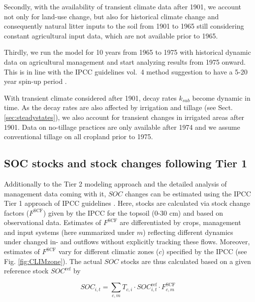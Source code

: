 \documentclass[gc, manuscript]{copernicus}
\begin{document}
Secondly, with the availability of transient climate data after 1901, we account not only for land-use change, but also for historical climate change and consequently natural litter inputs to the soil from 1901 to 1965 still considering constant agricultural input data, which are not available prior to 1965.

Thirdly, we run the model for 10 years from 1965 to 1975 with historical dynamic data on agricultural management and start analyzing results from 1975 onward. This is in line with the IPCC guidelines vol.~4 method suggestion to have a 5-20 year spin-up period \citep{ogle_cropland_in_ipcc_2019}.

With transient climate considered after 1901, decay rates \(k_{sub}\) become dynamic in time. As the decay rates are also affected by irrigation and tillage (see Sect. \ref{sec:steadystates}), we also account for transient changes in irrigated areas after 1901. Data on no-tillage practices are only available after 1974 and we assume conventional tillage on all cropland prior to 1975.

\hypertarget{sec:tier1}{%
\subsection{SOC stocks and stock changes following Tier 1}\label{sec:tier1}}

Additionally to the Tier 2 modeling approach \citep{ogle_cropland_in_ipcc_2019} and the detailed analysis of management data coming with it, \(SOC\) changes can be estimated using the IPCC Tier 1 approach of IPCC guidelines \citep{eggleston_ipcc_2006, calvo_buendia_ipcc_2019}. Here, stocks are calculated via stock change factors (\(F^{\mathrm{SCF}}\)) given by the IPCC for the topsoil (0-30 cm) and based on observational data. Estimates of \(F^{\mathrm{SCF}}\) are differentiated by crops, management and input systems (here summarized under \(m\)) reflecting different dynamics under changed in- and outflows without explicitly tracking these flows. Moreover, estimates of \(F^{\mathrm{SCF}}\) vary for different climatic zones (\(c\)) specified by the IPCC (see Fig. \ref{fig:CLIMzone}). The actual \(SOC\) stocks are thus calculated based on a given reference stock \(SOC^{\mathrm{ref}}\) by

\begin{equation}
SOC_{i,t} = \sum_{c,m} T_{c,i} \cdot SOC^{\mathrm{ref}}_{i,t} \cdot F^{\mathrm{SCF}}_{c,m}
\label{eq:tier1}
\end{equation}
\end{document}

